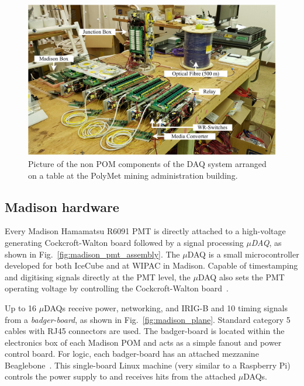 \begin{figure} %
    \includegraphics[width=\textwidth]{diagrams/5-daq/full_setup.pdf}
    \caption[Picture of the non POM components of the \chipsfive DAQ system]
    {Picture of the non POM components of the \chipsfive DAQ system arranged on a table at the
        PolyMet mining administration building.}
    \label{fig:full_setup}
\end{figure}
\subsection{Madison hardware} %
\label{sec:daq_hard_madison} %

Every Madison Hamamatsu R6091 PMT is directly attached to a high-voltage generating
Cockcroft-Walton board followed by a signal processing \emph{$\mu$DAQ}, as shown in
Fig.~\ref{fig:madison_pmt_assembly}. The $\mu$DAQ is a small microcontroller developed for both
IceCube and \chips at WIPAC in Madison. Capable of timestamping and digitising signals directly at
the PMT level, the $\mu$DAQ also sets the PMT operating voltage by controlling the
Cockcroft-Walton board~\cite{eijk2018}.

Up to 16 $\mu$DAQs receive power, networking, and IRIG-B and \unit{10}{} timing
signals from a \emph{badger-board}, as shown in Fig.~\ref{fig:madison_plane}. Standard category 5
cables with RJ45 connectors are used. The badger-board is located within the electronics box of
each Madison POM and acts as a simple fanout and power control board. For logic, each badger-board
has an attached mezzanine Beaglebone~\cite{beagle2020}. This single-board Linux machine (very
similar to a Raspberry Pi) controls the power supply to and receives hits from the attached
$\mu$DAQs.

